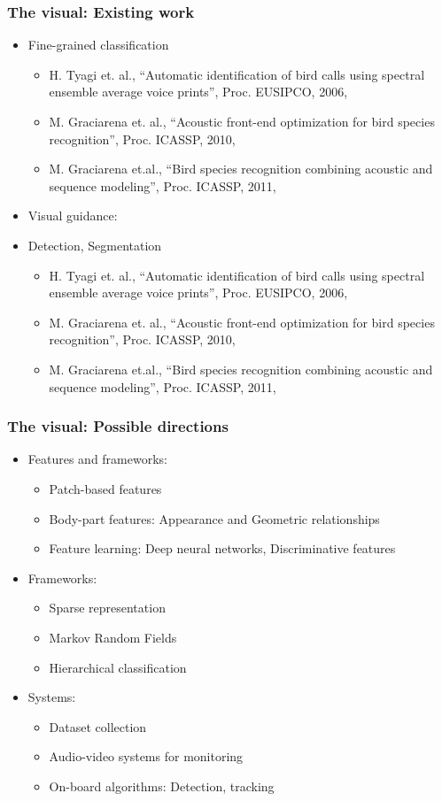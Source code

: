 \documentclass[mathserif]{beamer}
\begin{document}
\begin{frame}
\footnotesize
\frametitle{The visual: Existing work}
\begin{itemize}
	\item<2-> Fine-grained classification 
	\begin{itemize}
	\footnotesize
	\item H. Tyagi et. al., ``Automatic identification of bird calls using spectral 
	ensemble average voice prints'', Proc. EUSIPCO, 2006,
	\item M. Graciarena et. al., ``Acoustic front-end optimization for bird species recognition'', 
	Proc. ICASSP, 2010, 
	\item M. Graciarena et.al., ``Bird species recognition combining acoustic and sequence modeling'', 
	Proc. ICASSP, 2011, 
	\end{itemize}	
	\item<3-> Visual guidance: 
	\item<4-> Detection, Segmentation
	\begin{itemize}
	\footnotesize
	\item H. Tyagi et. al., ``Automatic identification of bird calls using spectral 
	ensemble average voice prints'', Proc. EUSIPCO, 2006,
	\item M. Graciarena et. al., ``Acoustic front-end optimization for bird species recognition'', 
	Proc. ICASSP, 2010, 
	\item M. Graciarena et.al., ``Bird species recognition combining acoustic and sequence modeling'', 
	Proc. ICASSP, 2011, 
	\end{itemize}
\end{itemize}
\end{frame}

\begin{frame}
\frametitle{The visual: Possible directions}
\begin{itemize}
\item<2-> Features and frameworks: 
\begin{itemize}
\item Patch-based features 
\item Body-part features: Appearance and Geometric relationships
\item Feature learning: Deep neural networks, Discriminative features
\end{itemize}
\item<3-> Frameworks:
\begin{itemize}
\item Sparse representation
\item Markov Random Fields
\item Hierarchical classification 
\end{itemize}
\item<4-> Systems:
\begin{itemize}
\item Dataset collection
\item Audio-video systems for monitoring
\item On-board algorithms: Detection, tracking
\end{itemize}
\end{itemize}
\end{frame}
\end{document}
